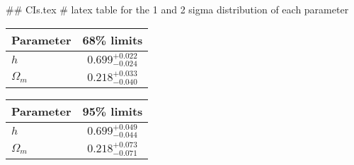 ## CIs.tex
# latex table for the 1 and 2 sigma distribution of each parameter

\begin{tabular} { l  c}
 Parameter &  68\% limits\\
\hline
{\boldmath$h              $} & $0.699^{+0.022}_{-0.024}   $\\
{\boldmath$\Omega_m       $} & $0.218^{+0.033}_{-0.040}   $\\
\hline
\end{tabular}

\begin{tabular} { l  c}
 Parameter &  95\% limits\\
\hline
{\boldmath$h              $} & $0.699^{+0.049}_{-0.044}   $\\
{\boldmath$\Omega_m       $} & $0.218^{+0.073}_{-0.071}   $\\
\hline
\end{tabular}
